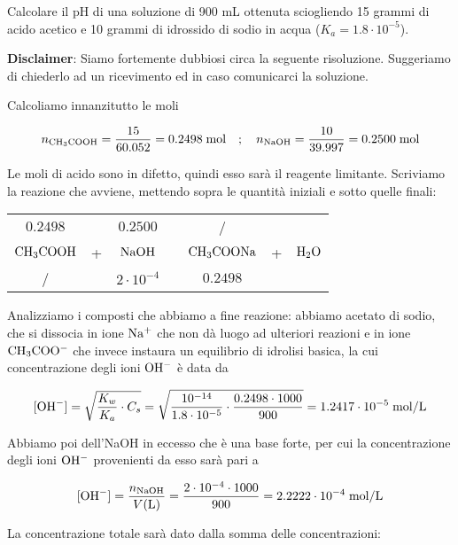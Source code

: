 \begin{esercizio}
    Calcolare il pH di una soluzione di 900 mL ottenuta sciogliendo 15 grammi di acido acetico e 10 grammi di idrossido di sodio in acqua ($K_a = 1.8 \cdot 10^{-5}$).
\end{esercizio}
\begin{soluzione}
    \textbf{Disclaimer}: Siamo fortemente dubbiosi circa la seguente risoluzione. Suggeriamo di chiederlo ad un ricevimento ed in caso comunicarci la soluzione.

\vspace{0.2cm}Calcoliamo innanzitutto le moli

$$n_{\rm CH_3COOH}=\frac{15}{60.052}=0.2498 \; \text{mol}
\quad;\quad
n_{\rm NaOH}=\frac{10}{39.997}=0.2500 \; \text{mol}$$

Le moli di acido sono in difetto, quindi esso sarà il reagente limitante. Scriviamo la reazione che avviene, mettendo sopra le quantità iniziali e sotto quelle finali:

\begin{center}
    \begin{tabular}{ccccccc}
        $0.2498$ &  & $0.2500$ & & / &&\\
        $\rm CH_3COOH$ & + & $\rm NaOH$ & \ce{->} & $\rm CH_3COONa$ & + & $\rm H_2O$\\
        / &  & $2 \cdot 10^{-4}$ & & $0.2498$ &&\\
    \end{tabular}
\end{center}

Analizziamo i composti che abbiamo a fine reazione: abbiamo acetato di sodio, che si dissocia in ione $\rm Na^+$ che non dà luogo ad ulteriori reazioni e in ione $\rm CH_3COO^-$ che invece instaura un equilibrio di idrolisi basica, la cui concentrazione degli ioni $\rm OH^-$ è data da

$$[\text{OH}^-]
=\sqrt{\frac{K_w}{K_a}\cdot C_s}
=\sqrt{\frac{10^{-14}}{1.8 \cdot 10^{-5}} \cdot \frac{0.2498 \cdot 1000}{900}}
=1.2417 \cdot 10^{-5} \; \rm mol/L$$

Abbiamo poi dell'NaOH in eccesso che è una base forte, per cui la concentrazione degli ioni $\rm OH^-$ provenienti da esso sarà pari a

$$[\text{OH}^-]=\frac{n_{\rm NaOH}}{V(\text{L})}
=\frac{2 \cdot 10^{-4} \cdot 1000}{900}=2.2222 \cdot 10^{-4} \; \rm mol/L$$

La concentrazione totale sarà dato dalla somma delle concentrazioni:


\end{soluzione}
